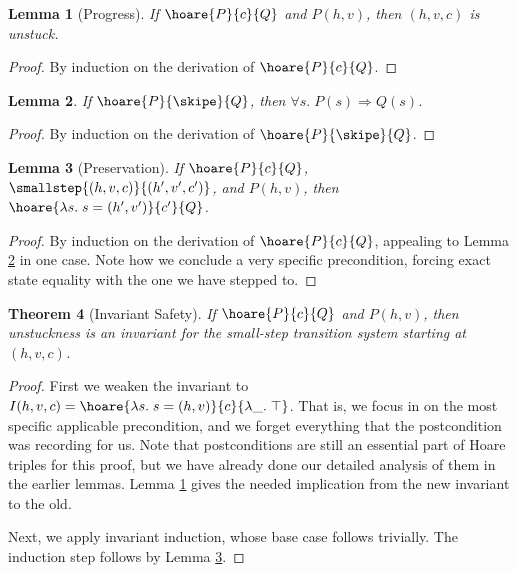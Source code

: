 \documentclass{amsbook}
\newtheorem{theorem}{Theorem}[chapter]
\newtheorem{lemma}[theorem]{Lemma}
\theoremstyle{definition}
\theoremstyle{remark}
\numberwithin{section}{chapter}
\numberwithin{equation}{chapter}
\begin{document}
\begin{lemma}[Progress]\label{hoare_progress}
  If $\hoare{P}{c}{Q}$ and $P(h, v)$, then $(h, v, c)$ is unstuck.
\end{lemma}
\begin{proof}
  By induction on the derivation of $\hoare{P}{c}{Q}$.
\end{proof}

\begin{lemma}\label{hoare_skip}
  If $\hoare{P}{\skipe}{Q}$, then $\forall s. \; P(s) \Rightarrow Q(s)$.
\end{lemma}
\begin{proof}
  By induction on the derivation of $\hoare{P}{\skipe}{Q}$.
\end{proof}

\begin{lemma}[Preservation]\label{hoare_preservation}
  If $\hoare{P}{c}{Q}$, $\smallstep{(h, v, c)}{(h', v', c')}$, and $P(h, v)$, then $\hoare{\lambda s. \; s = (h', v')}{c'}{Q}$.
\end{lemma}
\begin{proof}
  By induction on the derivation of $\hoare{P}{c}{Q}$, appealing to Lemma \ref{hoare_skip} in one case.  Note how we conclude a very specific precondition, forcing exact state equality with the one we have stepped to.
\end{proof}

\begin{theorem}[Invariant Safety]
\invariants
  If $\hoare{P}{c}{Q}$ and $P(h, v)$, then unstuckness is an invariant for the small-step transition system starting at $(h, v, c)$.
\end{theorem}
\begin{proof}
  First we weaken the invariant to $I(h, v, c) = \hoare{\lambda s. \; s = (h, v)}{c}{\lambda \_. \; \top}$.
  That is, we focus in on the most specific applicable precondition, and we forget everything that the postcondition was recording for us.
  Note that postconditions are still an essential part of Hoare triples for this proof, but we have already done our detailed analysis of them in the earlier lemmas.
  Lemma \ref{hoare_progress} gives the needed implication from the new invariant to the old.
  
  Next, we apply invariant induction, whose base case follows trivially.
  The induction step follows by Lemma \ref{hoare_preservation}.
\end{proof}


\end{document}
